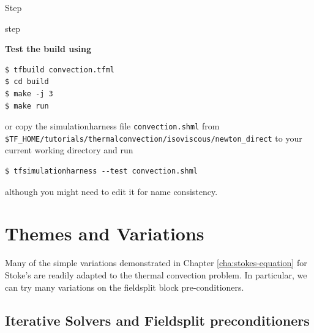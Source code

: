 \begin{steps}{Step}
\begin{steps}{step}
   \end{steps}
  \item \textbf{Test the build using}
   \begin{lstlisting}[style=Bash]
$ tfbuild convection.tfml
$ cd build
$ make -j 3
$ make run
   \end{lstlisting}
or copy the simulationharness file \texttt{convection.shml} from
\texttt{\$TF\_HOME/tutorials/thermalconvection/isoviscous/newton\_direct}
to your current working directory and run
\begin{lstlisting}[style=Bash]
  $ tfsimulationharness --test convection.shml 
\end{lstlisting}
although you might need to edit it for name consistency.

\end{steps}


\section{Themes and Variations}
\label{sec:themes-variations}

Many of the simple variations demonstrated in Chapter
\ref{cha:stokes-equation} for Stoke's  are readily adapted
to the thermal convection problem.  In particular, we can try many
variations on the fieldsplit block pre-conditioners.

\subsection{Iterative Solvers and Fieldsplit preconditioners}
\label{sec:iterative-solvers-1}


